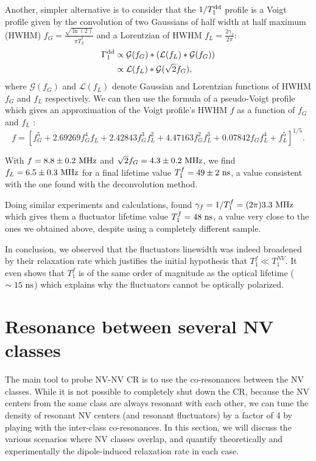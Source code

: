 \documentclass[a4paper, 11pt]{report}
\begin{document}
Another, simpler alternative is to consider that the $1/T_1^{\rm dd}$ profile is a Voigt profile given by the convolution of two Gaussians of half width at half maximum (HWHM) $f_G=\frac{\sqrt{\ln (2)}}{\pi T_2^*}$ and a Lorentzian of HWHM $f_L=\frac{2 \gamma_f}{2 \pi}$:
\begin{align*}
\Gamma_1^{\rm dd}&\propto \mathcal{G}(f_G)*(\mathcal{L}(f_L)*\mathcal{G}(f_G)) \\
&\propto \mathcal{L}(f_L)*\mathcal{G}(\sqrt{2} f_G),
\end{align*}
where $\mathcal{G}(f_G)$ and $\mathcal{L}(f_L)$ denote Gaussian and Lorentzian functions of HWHM $f_G$ and $f_L$ respectively.
We can then use the formula of a pseudo-Voigt profile which gives an approximation of the Voigt profile's HWHM $f$ as a function of $f_G$ and $f_L$ \citep{ida2000extended}:
\begin{equation}
f = [f_G^5 + 2.69269 f_G^4 f_L + 2.42843 f_G^3 f_L^2 + 4.47163 f_G^2 f_L^3 + 0.07842 f_G f_L^4 + f_L^5]^{1/5}.
\end{equation}

With $f=8.8 \pm 0.2\ \rm MHz$ and $\sqrt{2}f_G=4.3 \pm 0.2\ \rm MHz$, we find $f_L=6.5 \pm 0.3\ \rm MHz$ for a final lifetime value $T_1^f = 49 \pm 2\ \rm ns$, a value consistent with the one found with the deconvolution method.

Doing similar experiments and calculations, \citep{choi2017depolarization} found $\gamma_f=1/T_1^f=(2\pi) 3.3\ \rm MHz$ which gives them a fluctuator lifetime value $T_1^f = 48\ \rm ns$, a value very close to the ones we obtained above, despite using a completely different sample.

In conclusion, we observed that the fluctuators linewidth was indeed broadened by their relaxation rate which justifies the initial hypothesis that $T_1^f \ll T_1^{NV}$. It even shows that $T_1^f$ is of the same order of magnitude as the optical lifetime ($\sim 15\ \rm ns$) which explains why the fluctuators cannot be optically polarized.

\section{Resonance between several NV classes}

The main tool to probe NV-NV CR is to use the co-resonances between the NV classes. While it is not possible to completely shut down the CR, because the NV centers from the same class are always resonant with each other, we can tune the density of resonant NV centers (and resonant fluctuators) by a factor of 4 by playing with the inter-class co-resonances. In this section, we will discuss the various scenarios where NV classes overlap, and quantify theoretically and experimentally the dipole-induced relaxation rate in each case.
\end{document}
